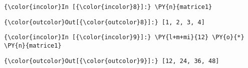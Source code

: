     \begin{Verbatim}[commandchars=\\\{\}]
{\color{incolor}In [{\color{incolor}8}]:} \PY{n}{matrice1}
\end{Verbatim}


\begin{Verbatim}[commandchars=\\\{\}]
{\color{outcolor}Out[{\color{outcolor}8}]:} [1, 2, 3, 4]
\end{Verbatim}
            
    \begin{Verbatim}[commandchars=\\\{\}]
{\color{incolor}In [{\color{incolor}9}]:} \PY{l+m+mi}{12} \PY{o}{*} \PY{n}{matrice1}
\end{Verbatim}


\begin{Verbatim}[commandchars=\\\{\}]
{\color{outcolor}Out[{\color{outcolor}9}]:} [12, 24, 36, 48]
\end{Verbatim}